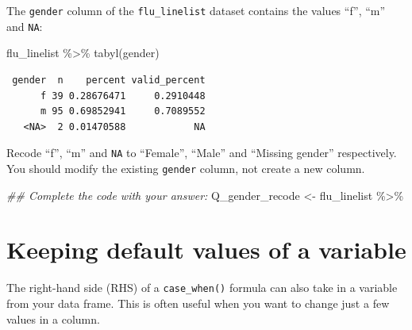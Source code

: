 \documentclass[
  letterpaper,
  DIV=11,
  numbers=noendperiod]{scrreprt}
\newenvironment{Shaded}{\begin{snugshade}}{\end{snugshade}}
\newcommand{\DocumentationTok}[1]{\textcolor[rgb]{0.37,0.37,0.37}{\textit{#1}}}
\newcommand{\FunctionTok}[1]{\textcolor[rgb]{0.28,0.35,0.67}{#1}}
\newcommand{\NormalTok}[1]{\textcolor[rgb]{0.00,0.23,0.31}{#1}}
\newcommand{\OtherTok}[1]{\textcolor[rgb]{0.00,0.23,0.31}{#1}}
\newcommand{\SpecialCharTok}[1]{\textcolor[rgb]{0.37,0.37,0.37}{#1}}
\begin{document}
\begin{tcolorbox}[enhanced jigsaw, title=\textcolor{quarto-callout-tip-color}{\faLightbulb}\hspace{0.5em}{Practice}, colbacktitle=quarto-callout-tip-color!10!white, leftrule=.75mm, arc=.35mm, opacityback=0, bottomrule=.15mm, rightrule=.15mm, toptitle=1mm, breakable, toprule=.15mm, colback=white, coltitle=black, colframe=quarto-callout-tip-color-frame, bottomtitle=1mm, titlerule=0mm, left=2mm, opacitybacktitle=0.6]

The \texttt{gender} column of the \texttt{flu\_linelist} dataset
contains the values ``f'', ``m'' and \texttt{NA}:

\begin{Shaded}
\begin{Highlighting}[]
\NormalTok{flu\_linelist }\SpecialCharTok{\%\textgreater{}\%} 
  \FunctionTok{tabyl}\NormalTok{(gender)}
\end{Highlighting}
\end{Shaded}

\begin{verbatim}
 gender  n    percent valid_percent
      f 39 0.28676471     0.2910448
      m 95 0.69852941     0.7089552
   <NA>  2 0.01470588            NA
\end{verbatim}

Recode ``f'', ``m'' and \texttt{NA} to ``Female'', ``Male'' and
``Missing gender'' respectively. You should modify the existing
\texttt{gender} column, not create a new column.

\begin{Shaded}
\begin{Highlighting}[]
\DocumentationTok{\#\# Complete the code with your answer:}
\NormalTok{Q\_gender\_recode }\OtherTok{\textless{}{-}} 
\NormalTok{  flu\_linelist }\SpecialCharTok{\%\textgreater{}\%} 
\end{Highlighting}
\end{Shaded}

\end{tcolorbox}

\section{Keeping default values of a
variable}\label{keeping-default-values-of-a-variable}

The right-hand side (RHS) of a \texttt{case\_when()} formula can also
take in a variable from your data frame. This is often useful when you
want to change just a few values in a column.
\end{document}
